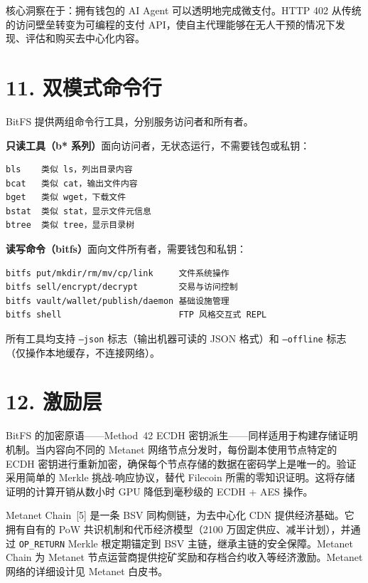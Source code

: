 \documentclass[11pt,a4paper]{article}
\begin{document}
核心洞察在于：拥有钱包的 AI Agent 可以透明地完成微支付。HTTP 402 从传统的访问壁垒转变为可编程的支付 API，使自主代理能够在无人干预的情况下发现、评估和购买去中心化内容。

\section{11. 双模式命令行}

BitFS 提供两组命令行工具，分别服务访问者和所有者。

\textbf{只读工具（b* 系列）}面向访问者，无状态运行，不需要钱包或私钥：

\begin{lstlisting}
bls    类似 ls，列出目录内容
bcat   类似 cat，输出文件内容
bget   类似 wget，下载文件
bstat  类似 stat，显示文件元信息
btree  类似 tree，显示目录树
\end{lstlisting}

\textbf{读写命令（bitfs）}面向文件所有者，需要钱包和私钥：

\begin{lstlisting}
bitfs put/mkdir/rm/mv/cp/link     文件系统操作
bitfs sell/encrypt/decrypt        交易与访问控制
bitfs vault/wallet/publish/daemon 基础设施管理
bitfs shell                       FTP 风格交互式 REPL
\end{lstlisting}

所有工具均支持 \texttt{--json} 标志（输出机器可读的 JSON 格式）和 \texttt{--offline} 标志（仅操作本地缓存，不连接网络）。

\section{12. 激励层}

BitFS 的加密原语——Method~42 ECDH 密钥派生——同样适用于构建存储证明机制。当内容向不同的 Metanet 网络节点分发时，每份副本使用节点特定的 ECDH 密钥进行重新加密，确保每个节点存储的数据在密码学上是唯一的。验证采用简单的 Merkle 挑战-响应协议，替代 Filecoin 所需的零知识证明。这将存储证明的计算开销从数小时 GPU 降低到毫秒级的 ECDH + AES 操作。

Metanet Chain~[5] 是一条 BSV 同构侧链，为去中心化 CDN 提供经济基础。它拥有自有的 PoW 共识机制和代币经济模型（2100 万固定供应、减半计划），并通过 \texttt{OP\_RETURN} Merkle 根定期锚定到 BSV 主链，继承主链的安全保障。Metanet Chain 为 Metanet 节点运营商提供挖矿奖励和存档合约收入等经济激励。Metanet 网络的详细设计见 Metanet 白皮书。
\end{document}
